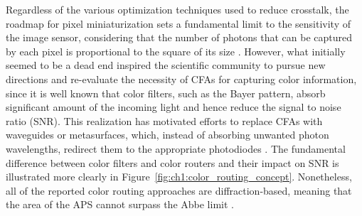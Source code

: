 Regardless of the various optimization techniques used to reduce crosstalk, the roadmap for pixel miniaturization sets a fundamental limit to the sensitivity of the image sensor, considering that the number of photons that can be captured by each pixel is proportional to the square of its size \cite{Kim2024FreeformSensors}. However, what initially seemed to be a dead end inspired the scientific community to pursue new directions and re-evaluate the necessity of CFAs for capturing color information, since it is well known that color filters, such as the Bayer pattern, absorb significant amount of the incoming light and hence reduce the signal to noise ratio (SNR). This realization has motivated efforts to replace CFAs with waveguides or metasurfaces, which, instead of absorbing unwanted photon wavelengths, redirect them to the appropriate photodiodes \cite{Nishiwaki2013EfficientSensors, Miyata2019High-SensitivityMetasurfaces, Kim2024FreeformSensors, Zou2022Pixel-levelMetasurfaces, Catrysse2022SubwavelengthEfficiency}. The fundamental difference between color filters and color routers and their impact on SNR is illustrated more clearly in Figure~\ref{fig:ch1:color_routing_concept}. Nonetheless, all of the reported color routing approaches are diffraction-based, meaning that the area of the APS cannot surpass the Abbe limit \cite{Shramkova2024HighSeparation}. 

